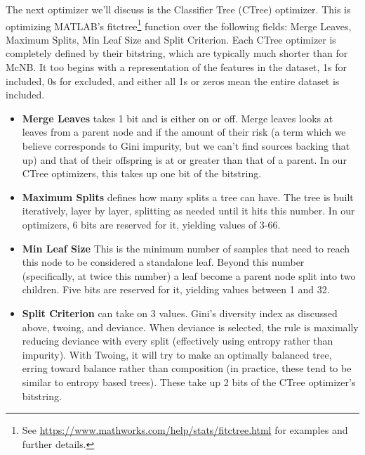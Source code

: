 The next optimizer we'll discuss is the Classifier Tree (CTree) optimizer.  This is optimizing MATLAB's fitctree\footnote{See \url{https://www.mathworks.com/help/stats/fitctree.html} for examples and further details.} function over the following fields: Merge Leaves, Maximum Splits, Min Leaf Size and Split Criterion.  Each CTree optimizer is completely defined by their bitstring, which are typically much shorter than for McNB.  It too begins with a representation of the features in the dataset, 1s for included, 0s for excluded, and either all 1s or zeros mean the entire dataset is included.  \begin{itemize}
	\item \textbf{Merge Leaves} takes 1 bit and is either on or off.  Merge leaves looks at leaves from a parent node and if the amount of their risk (a term which we believe corresponds to Gini impurity, but we can't find sources backing that up) and that of their offspring is at or greater than that of a parent.  In our CTree optimizers, this takes up one bit of the bitstring.
	\item \textbf{Maximum Splits} defines how many splits a tree can have.  The tree is built iteratively, layer by layer, splitting as needed until it hits this number.  In our optimizers, 6 bits are reserved for it, yielding values of 3-66.
	\item \textbf{Min Leaf Size} This is the minimum number of samples that need to reach this node to be considered a standalone leaf.  Beyond this number (specifically, at twice this number) a leaf become a parent node split into two children.  Five bits are reserved for it, yielding values between 1 and 32.
	\item \textbf{Split Criterion} can take on 3 values.  Gini's diversity index as discussed above, twoing, and deviance.  When deviance is selected, the rule is maximally reducing deviance with every split (effectively using entropy rather than impurity).  With Twoing, it will try to make an optimally balanced tree, erring toward balance rather than composition (in practice, these tend to be similar to entropy based trees).  These take up 2 bits of the CTree optimizer's bitstring.
\end{itemize}
